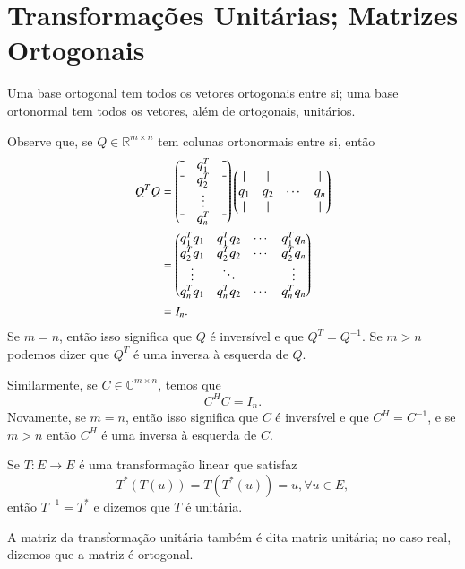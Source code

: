 \section{Transformações Unitárias; Matrizes Ortogonais}

Uma base ortogonal tem todos os vetores ortogonais entre si; uma base ortonormal tem todos os vetores, além de ortogonais, unitários.

Observe que, se $Q \in {\mathbb{R}}^{m\times n}$ tem colunas ortonormais entre si, então
\begin{align*}
	Q^TQ & = \begin{pmatrix}
    \textemdash & q_1^T & \textemdash\\
    \textemdash & q_2^T & \textemdash\\
    & \vdots & \\
    \textemdash & q_n^T & \textemdash\\
	\end{pmatrix}
    \begin{pmatrix}
    | & | & & |\\
    q_1 & q_2 &\cdots & q_n\\
    | & | & & |
    \end{pmatrix}
    \\
    &= \begin{pmatrix}
    q_1^Tq_1 & q_1^Tq_2 & \cdots & q_1^Tq_n\\
    q_2^Tq_1 & q_2^Tq_2 & \cdots & q_2^Tq_n\\
    \vdots & \ddots & & \vdots\\
    q_n^Tq_1 & q_n^Tq_2 & \cdots & q_n^Tq_n
    \end{pmatrix}\\
    & = I_n.
\end{align*}
Se $m=n$, então isso significa que $Q$ é inversível e que $Q^T=Q^{-1}$. Se $m>n$ podemos dizer que $Q^T$ é uma inversa à esquerda de $Q$.

Similarmente, se $C\in {\mathbb{C}}^{m\times n}$, temos que
\begin{equation*}
	C^HC = I_n.
\end{equation*}
Novamente, se $m=n$, então isso significa que $C$ é inversível e que $C^H=C^{-1}$, e se $m>n$ então $C^H$ é uma inversa à esquerda de $C$. 

\begin{defi}
	Se $T:E\to E$ é uma transformação linear que satisfaz
    \begin{equation*}
    	T^*(T(u)) = T(T^*(u))= u, \forall u \in E,
    \end{equation*}
    então $T^{-1}=T^*$ e dizemos que $T$ é unitária.
\end{defi}
A matriz da transformação unitária também é dita matriz unitária; no caso real, dizemos que a matriz é ortogonal.

